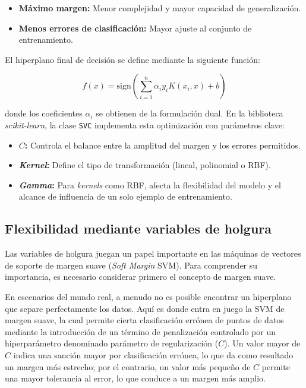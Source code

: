 \begin{itemize}
    \item \textbf{Máximo margen:} Menor complejidad y mayor capacidad de generalización.
    \item \textbf{Menos errores de clasificación:} Mayor ajuste al conjunto de entrenamiento.
\end{itemize}

El hiperplano final de decisión se define mediante la siguiente función:

\begin{equation}
f(x) = \text{sign} \left( \sum_{i=1}^{n} \alpha_i y_i K(x_i, x) + b \right)
\end{equation}

\noindent donde los coeficientes $\alpha_i$ se obtienen de la formulación dual. En la biblioteca \textit{scikit-learn}, la clase \texttt{SVC} implementa esta optimización con parámetros clave:

\begin{itemize}
    \item \textbf{$C$:} Controla el balance entre la amplitud del margen y los errores permitidos.
    \item \textbf{\textit{Kernel}:} Define el tipo de transformación (lineal, polinomial o RBF).
    \item \textbf{\textit{Gamma}:} Para \textit{kernels} como RBF, afecta la flexibilidad del modelo y el alcance de influencia de un solo ejemplo de entrenamiento.
\end{itemize}

\subsection{Flexibilidad mediante variables de holgura}

Las variables de holgura juegan un papel importante en las máquinas de vectores de soporte de margen suave (\textit{Soft Margin} SVM). Para comprender su importancia, es necesario considerar primero el concepto de margen suave.

En escenarios del mundo real, a menudo no es posible encontrar un hiperplano que separe perfectamente los datos. Aquí es donde entra en juego la SVM de margen suave, la cual permite cierta clasificación errónea de puntos de datos mediante la introducción de un término de penalización controlado por un hiperparámetro denominado parámetro de regularización ($C$). Un valor mayor de $C$ indica una sanción mayor por clasificación errónea, lo que da como resultado un margen más estrecho; por el contrario, un valor más pequeño de $C$ permite una mayor tolerancia al error, lo que conduce a un margen más amplio.




